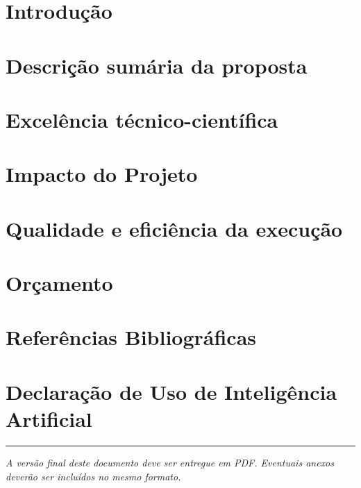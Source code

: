 \documentclass[11pt,a4paper]{article}
\begin{document}


\newpage
\pagestyle{frontmatter}
{\setlength{\parskip}{1pt}\tableofcontents}
\newpage
\pagestyle{fancy}

\section{Introdução}
\label{sec:intro}


\section{Descrição sumária da proposta}
\label{sec:sumario}


\section{Excelência técnico-científica}
\label{sec:excelencia}


\section{Impacto do Projeto}
\label{sec:impacto}


\section{Qualidade e eficiência da execução}
\label{sec:implementacao}


\section{Orçamento}
\label{sec:orcamento}


\section{Referências Bibliográficas}
\label{sec:referencias}


\section{Declaração de Uso de Inteligência Artificial}
\label{sec:declaracao_ia}


\vspace{1.2cm}
\noindent\textcolor{uaborder}{\rule{\textwidth}{0.6pt}}
\par\vspace{4pt}
{\sffamily\footnotesize\color{uamuted}\textit{A versão final deste documento deve ser entregue em PDF. Eventuais anexos deverão ser incluídos no mesmo formato.}}
\end{document}
